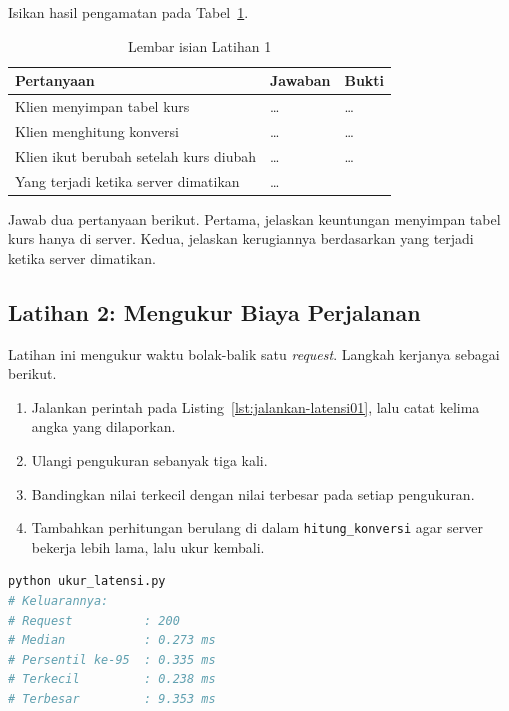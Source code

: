 Isikan hasil pengamatan pada Tabel~\ref{tab:lat1cs-hasil}.

\begin{table}[htbp]
  \centering
  \caption{Lembar isian Latihan 1}
  \label{tab:lat1cs-hasil}
  \begin{tabularx}{\textwidth}{|X|l|X|}
    \hline
    \textbf{Pertanyaan} & \textbf{Jawaban} & \textbf{Bukti} \\
    \hline
    Klien menyimpan tabel kurs & \dots & \dots \\
    \hline
    Klien menghitung konversi & \dots & \dots \\
    \hline
    Klien ikut berubah setelah kurs diubah & \dots & \dots \\
    \hline
    Yang terjadi ketika server dimatikan & \multicolumn{2}{X|}{\dots} \\
    \hline
  \end{tabularx}
\end{table}

Jawab dua pertanyaan berikut. Pertama, jelaskan keuntungan menyimpan tabel kurs
hanya di server. Kedua, jelaskan kerugiannya berdasarkan yang terjadi ketika
server dimatikan.

\subsection*{Latihan 2: Mengukur Biaya Perjalanan}

Latihan ini mengukur waktu bolak-balik satu \textit{request}. Langkah kerjanya sebagai
berikut.

\begin{enumerate}
  \item Jalankan perintah pada Listing~\ref{lst:jalankan-latensi01}, lalu catat
    kelima angka yang dilaporkan.
  \item Ulangi pengukuran sebanyak tiga kali.
  \item Bandingkan nilai terkecil dengan nilai terbesar pada setiap pengukuran.
  \item Tambahkan perhitungan berulang di dalam \texttt{hitung\_konversi} agar
    server bekerja lebih lama, lalu ukur kembali.
\end{enumerate}

\begin{lstlisting}[language=bash, caption={Mengukur waktu bolak-balik, skrip
  tersedia di \berkas{sources/chapter01/ukur_latensi.py}},
  label=lst:jalankan-latensi01]
python ukur_latensi.py
# Keluarannya:
# Request          : 200
# Median           : 0.273 ms
# Persentil ke-95  : 0.335 ms
# Terkecil         : 0.238 ms
# Terbesar         : 9.353 ms
\end{lstlisting}

